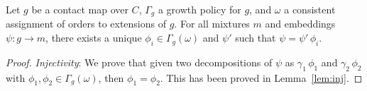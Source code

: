 \documentclass[a4paper,12pt]{article}
\newcommand{\ie}{i.e.\xspace}
\newcommand{\lem}[1]{Lemma~\ref{lem:#1}}
\newcommand{\anon}[1]{\left|#1\right|}
\newcommand{\gp}{\Gamma}
\begin{document}
\begin{theorem}
  Let $g$ be a contact map over $C$,
  $\gp_g$ a growth policy for $g$,
  and $\omega$ a consistent assignment of orders
  to extensions of $g$.
  For all mixtures $m$ and embeddings $\psi: g \to m$,
  there exists a unique $\phi_i \in \gp_g(\omega)$
  and $\psi'$ such that $\psi = \psi' \, \phi_i$.
\end{theorem}
\begin{proof}
  \emph{Injectivity}:
  We prove that given two decompositions of $\psi$
  as $\gamma_1\,\phi_1$ and $\gamma_2\,\phi_2$
  with $\phi_1,\phi_2 \in \gp_g(\omega)$,
  then $\phi_1 = \phi_2$.
  This has been proved in \lem{inj}.


\end{proof}
\end{document}
